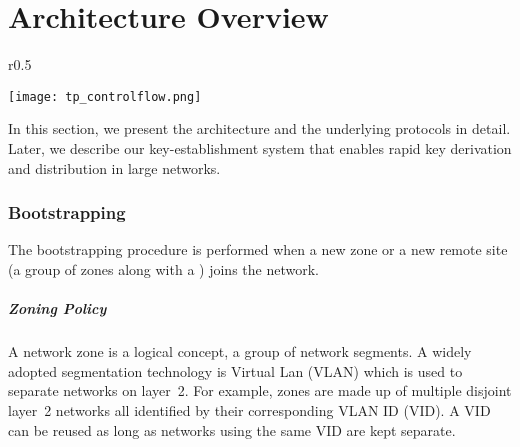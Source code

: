 \chapter{Architecture Overview}

\begin{wrapfigure}{r}{0.5\textwidth}
    \begin{center}
        \texttt{[image: tp\_controlflow.png]}
        \label{archi:overview}
    \end{center}
\end{wrapfigure}

In this section, we present the \name architecture and the underlying protocols in detail. 
Later, we describe our key-establishment system that enables rapid key derivation 
and distribution in large networks. 

\subsection{\name Bootstrapping}
\label{ssec:bootstrapping}

The bootstrapping procedure is performed when a new zone or a new remote site 
(a group of zones along with a \tp) joins the network. 

\paragraph{Zoning Policy} %
A network zone is a logical concept, a group of network segments. A widely adopted 
segmentation technology is Virtual Lan (VLAN) which is used to separate networks on
layer~2. For example, zones are made up of multiple disjoint layer~2 networks
all identified by their corresponding VLAN ID (VID). A VID can be reused as long
as networks using the same VID are kept separate.

